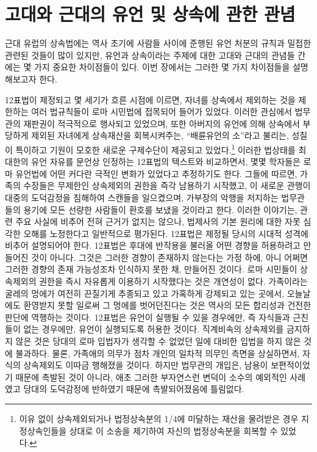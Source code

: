 \chapter{고대와 근대의 유언 및 상속에 관한 관념}

근대 유럽의 상속법에는
역사 초기에 사람들 사이에 준행된 유언 처분의 규칙과
밀접한 관련된 것들이 많이 있지만,
유언과 상속이라는 주제에 대한 고대와 근대의 관념들 간에는
몇 가지 중요한 차이점들이 있다.
이번 장에서는 그러한 몇 가지 차이점들을 설명해보고자 한다.

12표법이 제정되고 몇 세기가 흐른 시점에 이르면,
자녀를 상속에서 제외하는 것을 제한하는
여러 법규칙들이
로마 시민법에
접목되어 들어가 있었다.
이러한 관심에서 법무관의 재판권이 적극적으로 행사되고 있었으며,
또한
아버지의 유언에 의해 상속에서 부당하게 제외된 자녀에게
상속재산을 회복시켜주는,
``배륜유언의
소''라고 불리는,
성질이 특이하고 기원이 모호한 새로운 구제수단이 제공되고 있었다.\footnote{%
  이유 없이 상속제외되거나
  법정상속분의 1/4에 미달하는 재산을 물려받은 경우
  지정상속인들을 상대로 이 소송을 제기하여 자신의 법정상속분을
  회복할 수 있었다. }
이러한 법상태를
최대한의 유언 자유를 문언상 인정하는 12표법의 텍스트와 비교하면서,
몇몇 학자들은 로마 유언법에 어떤 커다란 극적인 변화가 있었다고
추정하기도 한다.
그들에 따르면,
가족의 수장들은 무제한인 상속제외의 권한을 즉각 남용하기 시작했고,
이 새로운 관행이 대중의 도덕감정을 침해하여 스캔들을 일으켰으며,
가부장의 악행을 저지하는 법무관들의 용기에 모든 선량한 사람들이
환호를 보냈을 것이라고 한다.
이러한 이야기는,
관련 주요 사실에 비추어 전혀 근거가 없지는 않으나,
법제사의 기본 원리에 대한 자못 심각한 오해를 노정한다고
일반적으로 평가된다.
12표법은 제정될 당시의 시대적 성격에 비추어 설명되어야 한다.
12표법은 후대에 반작용을 불러올 어떤 경향을 허용하려고 만들어진 것이 아니다.
그것은 그러한 경향이 존재하지 않는다는 가정 하에,
아니 어쩌면 그러한 경향의 존재 가능성조차 인식하지 못한 채,
만들어진 것이다.
로마 시민들이 상속제외의 권한을 즉시 자유롭게 이용하기 시작했다는 것은
개연성이 없다.
가족이라는 굴레의 멍에가
여전히 끈질기게 추종되고 있고
가혹하게 강제되고 있는 곳에서,
오늘날에도 환영받지 못할 일로써
그 멍에를 벗어던진다는 것은
역사의 모든 합리성과 건전한 판단에 역행하는 것이다.
12표법은 유언이 실행될 수 있을 경우에만,
즉 자식들과 근친들이 없는 경우에만,
유언이
실행되도록 허용한 것이다.
직계비속의 상속제외를 금지하지 않은 것은
당대의 로마 입법자가 생각할 수 없었던 일에 대비한 입법을
하지 않은 것에 불과하다.
물론, 가족애의 의무가 점차 개인의 일차적 의무인 측면을 상실하면서,
자식의 상속제외도 이따금 행해졌을 것이다.
하지만 법무관의 개입은,
남용이 보편적이었기 때문에 촉발된 것이 아니라,
애초 그러한 부자연스런 변덕이 소수의 예외적인 사례였고
당대의 도덕감정에 반하였기 때문에 촉발되어졌음에 틀림없다.

